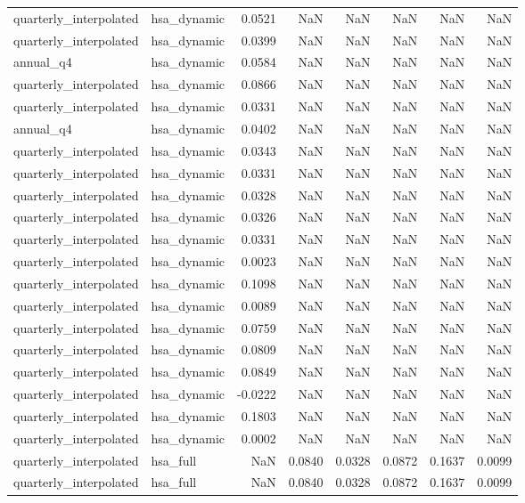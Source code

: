 \begin{tabular}{llrrrrrr}
quarterly\_interpolated & hsa\_dynamic & 0.0521 & NaN & NaN & NaN & NaN & NaN \\
quarterly\_interpolated & hsa\_dynamic & 0.0399 & NaN & NaN & NaN & NaN & NaN \\
annual\_q4 & hsa\_dynamic & 0.0584 & NaN & NaN & NaN & NaN & NaN \\
quarterly\_interpolated & hsa\_dynamic & 0.0866 & NaN & NaN & NaN & NaN & NaN \\
quarterly\_interpolated & hsa\_dynamic & 0.0331 & NaN & NaN & NaN & NaN & NaN \\
annual\_q4 & hsa\_dynamic & 0.0402 & NaN & NaN & NaN & NaN & NaN \\
quarterly\_interpolated & hsa\_dynamic & 0.0343 & NaN & NaN & NaN & NaN & NaN \\
quarterly\_interpolated & hsa\_dynamic & 0.0331 & NaN & NaN & NaN & NaN & NaN \\
quarterly\_interpolated & hsa\_dynamic & 0.0328 & NaN & NaN & NaN & NaN & NaN \\
quarterly\_interpolated & hsa\_dynamic & 0.0326 & NaN & NaN & NaN & NaN & NaN \\
quarterly\_interpolated & hsa\_dynamic & 0.0331 & NaN & NaN & NaN & NaN & NaN \\
quarterly\_interpolated & hsa\_dynamic & 0.0023 & NaN & NaN & NaN & NaN & NaN \\
quarterly\_interpolated & hsa\_dynamic & 0.1098 & NaN & NaN & NaN & NaN & NaN \\
quarterly\_interpolated & hsa\_dynamic & 0.0089 & NaN & NaN & NaN & NaN & NaN \\
quarterly\_interpolated & hsa\_dynamic & 0.0759 & NaN & NaN & NaN & NaN & NaN \\
quarterly\_interpolated & hsa\_dynamic & 0.0809 & NaN & NaN & NaN & NaN & NaN \\
quarterly\_interpolated & hsa\_dynamic & 0.0849 & NaN & NaN & NaN & NaN & NaN \\
quarterly\_interpolated & hsa\_dynamic & -0.0222 & NaN & NaN & NaN & NaN & NaN \\
quarterly\_interpolated & hsa\_dynamic & 0.1803 & NaN & NaN & NaN & NaN & NaN \\
quarterly\_interpolated & hsa\_dynamic & 0.0002 & NaN & NaN & NaN & NaN & NaN \\
quarterly\_interpolated & hsa\_full & NaN & 0.0840 & 0.0328 & 0.0872 & 0.1637 & 0.0099 \\
quarterly\_interpolated & hsa\_full & NaN & 0.0840 & 0.0328 & 0.0872 & 0.1637 & 0.0099 \\

\end{tabular}
